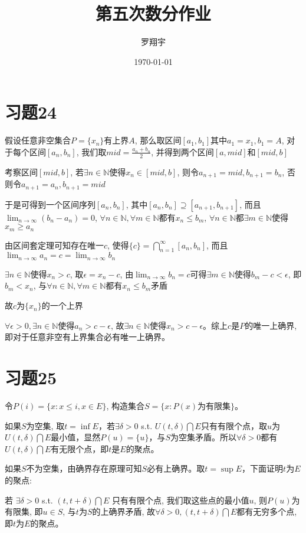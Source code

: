 \documentclass[a4paper,11pt]{article}
\title{第五次数分作业}
\author{罗翔宇}
\date{\today}
\newcommand{\Limit}{\displaystyle \lim_{n \rightarrow \infty}}
\begin{document}
\maketitle

\section*{习题24}
假设任意非空集合$P = \{x_n\}$有上界$A$, 那么取区间$[a_1, b_1]$其中$a_1 = x_1, b_1 = A$, 对于每个区间$[a_n, b_n]$, 我们取$mid = \frac{a_n + b_n}{2}$, 并得到两个区间$[a, mid]$和$[mid, b]$

考察区间$[mid, b]$, 若$\exists n \in \mathbb{N}$使得$x_n \in [mid, b]$, 则令$a_{n+1} = mid, b_{n+1} = b_n$, 否则令$a_{n+1} = a_n, b_{n+1} = mid$

于是可得到一个区间序列$[a_n, b_n]$, 其中$[a_n, b_n] \supseteq [a_{n+1}, b_{n+1}]$, 而且$\Limit (b_n - a_n) = 0$, $\forall n \in \mathbb{N}, \forall m \in \mathbb{N}$都有$x_n \le b_m$, $\forall n \in \mathbb{N}$都$\exists m \in \mathbb{N}$使得$x_m \ge a_n$

由区间套定理可知存在唯一$c$, 使得$\displaystyle \{c\} = \bigcap_{n=1}^{\infty} [a_n, b_n]$, 而且$\Limit a_n = c = \Limit b_n$

$\exists n \in \mathbb{N}$使得$x_n > c$, 取$\epsilon = x_n - c$, 由$\Limit b_n = c$可得$\exists m \in \mathbb{N}$使得$b_m - c < \epsilon$, 即$b_m < x_n$, 与$\forall n \in \mathbb{N}, \forall m \in \mathbb{N}$都有$x_n \le b_m$矛盾

故$c$为$\{x_n\}$的一个上界

$\forall \epsilon > 0, \exists n \in \mathbb{N}$使得$a_n > c - \epsilon$, 故$\exists n \in \mathbb{N}$使得$x_n > c - \epsilon$。综上$c$是$P$的唯一上确界, 即对于任意非空有上界集合必有唯一上确界。
\section*{习题25}
令$P(i) = \{x: x \le i, x \in E\}$, 构造集合$S = \{x: P(x)$为有限集$\}$。

如果$S$为空集, 取$t = \inf E$，若$\exists \delta > 0$ s.t. $U(t, \delta)\bigcap E$只有有限个点，取$u$为$U(t, \delta)\bigcap E$最小值，显然$P(u)=\{u\}$，与$S$为空集矛盾。所以$\forall \delta > 0$都有$U(t, \delta)\bigcap E$有无限个点，即$t$是$E$的聚点。

如果$S$不为空集，由确界存在原理可知$S$必有上确界。取$t = \sup E$，下面证明$t$为$E$的聚点:

若 $\exists \delta > 0$ s.t. $(t, t + \delta)\bigcap E$ 只有有限个点, 我们取这些点的最小值$u$, 则$P(u)$为有限集, 即$u \in S$, 与$t$为$S$的上确界矛盾, 故$\forall \delta > 0, (t, t + \delta)\bigcap E$都有无穷多个点, 即$t$为$E$的聚点。
\end{document}
